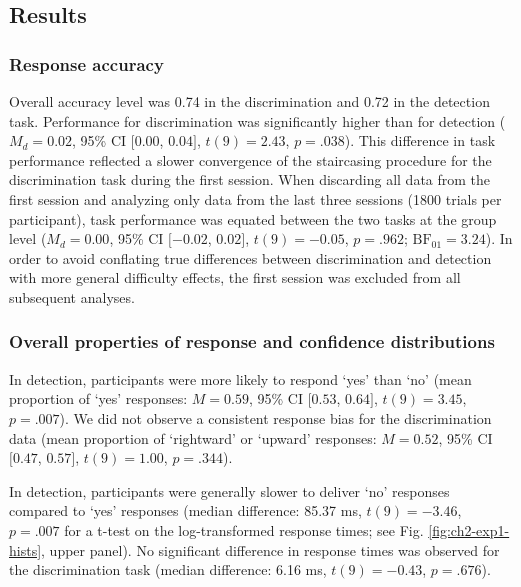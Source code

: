 \documentclass[12pt,twoside]{reedthesis}
\begin{document}
\hypertarget{results-5}{%
\subsection{Results}\label{results-5}}

\hypertarget{response-accuracy}{%
\subsubsection{Response accuracy}\label{response-accuracy}}

Overall accuracy level was 0.74 in the discrimination and 0.72 in the detection task. Performance for discrimination was significantly higher than for detection (\(M_d = 0.02\), 95\% CI \([0.00\), \(0.04]\), \(t(9) = 2.43\), \(p = .038\)). This difference in task performance reflected a slower convergence of the staircasing procedure for the discrimination task during the first session. When discarding all data from the first session and analyzing only data from the last three sessions (1800 trials per participant), task performance was equated between the two tasks at the group level (\(M_d = 0.00\), 95\% CI \([-0.02\), \(0.02]\), \(t(9) = -0.05\), \(p = .962\); \(\mathrm{BF}_{\textrm{01}} = 3.24\)). In order to avoid conflating true differences between discrimination and detection with more general difficulty effects, the first session was excluded from all subsequent analyses.

\hypertarget{overall-properties-of-response-and-confidence-distributions}{%
\subsubsection{Overall properties of response and confidence distributions}\label{overall-properties-of-response-and-confidence-distributions}}

In detection, participants were more likely to respond `yes' than `no' (mean proportion of `yes' responses: \(M = 0.59\), 95\% CI \([0.53\), \(0.64]\), \(t(9) = 3.45\), \(p = .007\)). We did not observe a consistent response bias for the discrimination data (mean proportion of `rightward' or `upward' responses: \(M = 0.52\), 95\% CI \([0.47\), \(0.57]\), \(t(9) = 1.00\), \(p = .344\)).

In detection, participants were generally slower to deliver `no' responses compared to `yes' responses (median difference: 85.37 ms, \(t(9) = -3.46\), \(p = .007\) for a t-test on the log-transformed response times; see Fig. \ref{fig:ch2-exp1-hists}, upper panel). No significant difference in response times was observed for the discrimination task (median difference: 6.16 ms, \(t(9) = -0.43\), \(p = .676\)).
\end{document}
